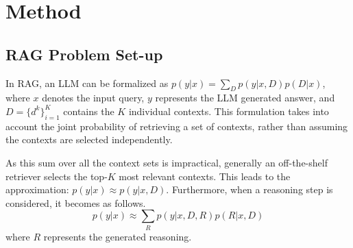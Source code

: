 

\section{Method}

\subsection{RAG Problem Set-up}
In RAG, an LLM can be formalized as $p(y|x) = \sum_{D} p(y|x, D) p(D|x)$, where $x$ denotes the input query, $y$ represents the LLM generated answer, and $D=\{d^k\}_{i=1}^{K}$ contains the $K$ individual contexts. This formulation takes into account the joint probability of retrieving a set of contexts, rather than assuming the contexts are selected independently.

As this sum over all the context sets is impractical, generally an off-the-shelf retriever selects the top-$K$ most relevant contexts. This leads to the approximation: $p(y|x) \approx p(y| x, D)$. Furthermore, when a reasoning step is considered, it becomes as follows.
\begin{equation}
\label{eq1} 
    p(y|x) \approx \sum_{R} p(y|x, D, R) p(R|x,D)
\end{equation}
where $R$ represents the generated reasoning.

\begin{comment}
In the context of retrieval-augmented generation (RAG), a large language model (LLM) can be formalized as \( p(y|x) = \sum_{\{d_1, d_2, \dots, d_k\}} p(y|x, \{d_1, d_2, \dots, d_k\}) p(\{d_1, d_2, \dots, d_k\}|x) \), where \( x \) denotes the input query, \( y \) represents the model’s generated output, and \( \{d_i\}_{i=1}^{k} \) are the documents retrieved from a large corpus. This formulation takes into account the joint probability of retrieving a set of documents \( \{d_1, d_2, \dots, d_k\} \), rather than assuming the documents are selected independently.

Since summing over all possible document sets is computationally infeasible, an off-the-shelf retriever is employed to select the top-\( k \) documents most relevant to the query. This leads to the following approximation: 
\[
p(y|x) \approx p(y|x, d_1, d_2, \dots, d_k)
\]
where \( d_1, d_2, \dots, d_k \) are the top-\( k \) documents provided as input to the model. This allows the model to focus on a limited set of relevant information, reducing complexity and improving response quality.

When a single reasoning step is incorporated, the process can be expressed as:
\[
p(y|x) \approx \sum_{R} p(y|x, d_1, d_2, \dots, d_k, R) p(R|x, d_1, d_2, \dots, d_k)
\]
where \( R \) denotes the reasoning step, and \( p(R|x, d_1, d_2, \dots, d_k) \) represents the probability of selecting a specific reasoning process given the input query and the retrieved documents. This refinement accounts for the reasoning involved in generating the response from the retrieved documents, ensuring that the model can better integrate and reason over the relevant information.
\end{comment}

